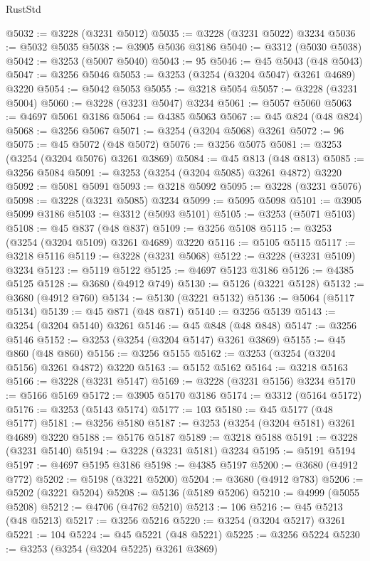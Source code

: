 \begin{lexlean}{RustStd}
\begin{coremodule}
@5032 := @3228 (@3231 @5012)
@5035 := @3228 (@3231 @5022) @3234
@5036 := @5032 @5035
@5038 := @3905 @5036 @3186
@5040 := @3312 (@5030 @5038)
@5042 := @3253 (@5007 @5040)
@5043 := 95
@5046 := @45 @5043 (@48 @5043)
@5047 := @3256 @5046
@5053 := @3253 (@3254 (@3204 @5047) @3261 @4689) @3220
@5054 := @5042 @5053
@5055 := @3218 @5054
@5057 := @3228 (@3231 @5004)
@5060 := @3228 (@3231 @5047) @3234
@5061 := @5057 @5060
@5063 := @4697 @5061 @3186
@5064 := @4385 @5063
@5067 := @45 @824 (@48 @824)
@5068 := @3256 @5067
@5071 := @3254 (@3204 @5068) @3261
@5072 := 96
@5075 := @45 @5072 (@48 @5072)
@5076 := @3256 @5075
@5081 := @3253 (@3254 (@3204 @5076) @3261 @3869)
@5084 := @45 @813 (@48 @813)
@5085 := @3256 @5084
@5091 := @3253 (@3254 (@3204 @5085) @3261 @4872) @3220
@5092 := @5081 @5091
@5093 := @3218 @5092
@5095 := @3228 (@3231 @5076)
@5098 := @3228 (@3231 @5085) @3234
@5099 := @5095 @5098
@5101 := @3905 @5099 @3186
@5103 := @3312 (@5093 @5101)
@5105 := @3253 (@5071 @5103)
@5108 := @45 @837 (@48 @837)
@5109 := @3256 @5108
@5115 := @3253 (@3254 (@3204 @5109) @3261 @4689) @3220
@5116 := @5105 @5115
@5117 := @3218 @5116
@5119 := @3228 (@3231 @5068)
@5122 := @3228 (@3231 @5109) @3234
@5123 := @5119 @5122
@5125 := @4697 @5123 @3186
@5126 := @4385 @5125
@5128 := @3680 (@4912 @749)
@5130 := @5126 (@3221 @5128)
@5132 := @3680 (@4912 @760)
@5134 := @5130 (@3221 @5132)
@5136 := @5064 (@5117 @5134)
@5139 := @45 @871 (@48 @871)
@5140 := @3256 @5139
@5143 := @3254 (@3204 @5140) @3261
@5146 := @45 @848 (@48 @848)
@5147 := @3256 @5146
@5152 := @3253 (@3254 (@3204 @5147) @3261 @3869)
@5155 := @45 @860 (@48 @860)
@5156 := @3256 @5155
@5162 := @3253 (@3254 (@3204 @5156) @3261 @4872) @3220
@5163 := @5152 @5162
@5164 := @3218 @5163
@5166 := @3228 (@3231 @5147)
@5169 := @3228 (@3231 @5156) @3234
@5170 := @5166 @5169
@5172 := @3905 @5170 @3186
@5174 := @3312 (@5164 @5172)
@5176 := @3253 (@5143 @5174)
@5177 := 103
@5180 := @45 @5177 (@48 @5177)
@5181 := @3256 @5180
@5187 := @3253 (@3254 (@3204 @5181) @3261 @4689) @3220
@5188 := @5176 @5187
@5189 := @3218 @5188
@5191 := @3228 (@3231 @5140)
@5194 := @3228 (@3231 @5181) @3234
@5195 := @5191 @5194
@5197 := @4697 @5195 @3186
@5198 := @4385 @5197
@5200 := @3680 (@4912 @772)
@5202 := @5198 (@3221 @5200)
@5204 := @3680 (@4912 @783)
@5206 := @5202 (@3221 @5204)
@5208 := @5136 (@5189 @5206)
@5210 := @4999 (@5055 @5208)
@5212 := @4706 (@4762 @5210)
@5213 := 106
@5216 := @45 @5213 (@48 @5213)
@5217 := @3256 @5216
@5220 := @3254 (@3204 @5217) @3261
@5221 := 104
@5224 := @45 @5221 (@48 @5221)
@5225 := @3256 @5224
@5230 := @3253 (@3254 (@3204 @5225) @3261 @3869)

\end{coremodule}
\end{lexlean}
